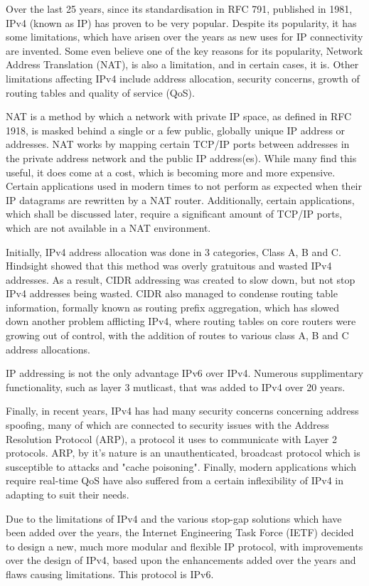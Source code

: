 
Over the last 25 years, since its standardisation in RFC 791, published
in 1981, IPv4 (known as IP) has proven to be very popular. Despite its 
popularity, it has some limitations, which have arisen over the years 
as new uses for IP connectivity are invented. Some even believe one of 
the key reasons for its popularity, Network Address Translation (NAT), 
is also a limitation, and in certain cases, it is. Other limitations
affecting IPv4 include address allocation, security concerns, growth of 
routing tables and quality of service (QoS).


NAT is a method by which a network with private IP space, as defined in
RFC 1918, is masked behind a single or a few public, globally unique IP
address or addresses. NAT works by mapping certain TCP/IP ports between
addresses in the private address network and the public IP address(es).
While many find this useful, it does come at a cost, which is becoming
more and more expensive. Certain applications used in modern times to
not perform as expected when their IP datagrams are rewritten by a NAT
router. Additionally, certain applications, which shall be discussed
later, require a significant amount of TCP/IP ports, which are not
available in a NAT environment.


Initially, IPv4 address allocation was done in 3 categories, Class A, B
and C. Hindsight showed that this method was overly gratuitous and
wasted IPv4 addresses. As a result, CIDR addressing was created to slow 
down, but not stop IPv4 addresses being wasted. CIDR also managed to condense 
routing table information, formally known as routing prefix aggregation, 
which has slowed down another problem afflicting IPv4, where routing tables 
on core routers were growing out of control, with the addition of routes to
various class A, B and C address allocations.


IP addressing is not the only advantage IPv6 over IPv4. Numerous
supplimentary functionality, such as layer 3 mutlicast, that was added to IPv4 over 20 years.

Finally, in recent years, IPv4 has had many security concerns concerning
address spoofing, many of which are connected to security issues with
the Address Resolution Protocol (ARP), a protocol it uses to communicate
with Layer 2 protocols. ARP, by it's nature is an unauthenticated, 
broadcast protocol which is susceptible to attacks and "cache poisoning".
Finally, modern applications which require real-time QoS have also 
suffered from a certain inflexibility of IPv4 in adapting to suit their 
needs.


Due to the limitations of IPv4 and the various stop-gap solutions which
have been added over the years, the Internet Engineering Task Force
(IETF) decided to design a new, much more modular and flexible IP
protocol, with improvements over the design of IPv4, based upon the
enhancements added over the years and flaws causing limitations. This
protocol is IPv6.

